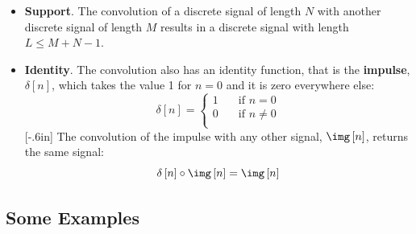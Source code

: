 \begin{itemize}
\item {\bf Support}. The convolution of a discrete signal of length $N$ with another discrete signal of length $M$ results in a discrete signal with length $L \leq M+N-1$.

\item {\bf Identity}. The convolution also has an identity function, that is the {\bf impulse}, 
$\delta \left[n\right]$, which takes the value 1 for $n=0$ and it is zero everywhere else:
\begin{equation}
\delta \left[n\right] =
  \begin{cases}
    1       & \quad \text{if } n=0\\
    0       & \quad \text{if } n \neq 0 \\
  \end{cases}
\end{equation}
[-.6in]
The convolution of the impulse with any other signal, $\img \left[n\right]$, returns the same signal:
\begin{equation}
 \delta \left[n\right] \circ \img \left[n\right] = \img \left[n\right]
\end{equation}
\end{itemize}

\subsection{Some Examples}

